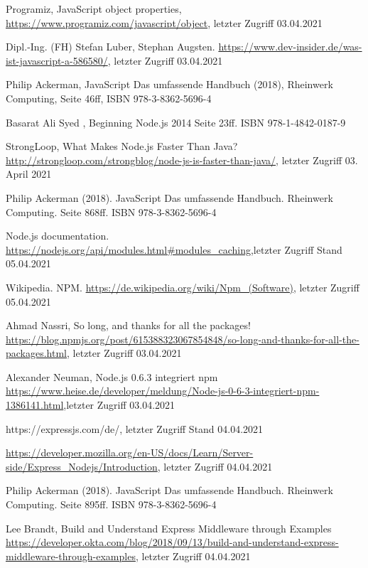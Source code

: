 \documentclass[11pt,a4paper]{article}
\begin{document}
\begin{itemize}
 Programiz, JavaScript object properties, \url{https://www.programiz.com/javascript/object}, letzter Zugriff 03.04.2021

 Dipl.-Ing. (FH) Stefan Luber, Stephan Augsten. \url{https://www.dev-insider.de/was-ist-javascript-a-586580/}, letzter Zugriff 03.04.2021

 Philip Ackerman, JavaScript Das umfassende Handbuch (2018), Rheinwerk Computing, Seite 46ff, ISBN 978-3-8362-5696-4

%
%
%
%



 Basarat Ali Syed , Beginning Node.js 2014 Seite 23ff. ISBN 978-1-4842-0187-9

 StrongLoop, What Makes Node.js Faster Than Java? \url{http://strongloop.com/strongblog/node-js-is-faster-than-java/}, letzter Zugriff 03. April 2021

 Philip Ackerman (2018). JavaScript Das umfassende Handbuch. Rheinwerk Computing. Seite 868ff. ISBN 978-3-8362-5696-4

 Node.js documentation. \url{https://nodejs.org/api/modules.html#modules_caching},letzter Zugriff Stand 05.04.2021

 Wikipedia. NPM. \url{https://de.wikipedia.org/wiki/Npm_(Software)}, letzter Zugriff 05.04.2021

 Ahmad Nassri, So long, and thanks for all the packages! \url{https://blog.npmjs.org/post/615388323067854848/so-long-and-thanks-for-all-the-packages.html}, letzter Zugriff 03.04.2021

 Alexander Neuman, Node.js 0.6.3 integriert npm
\url{https://www.heise.de/developer/meldung/Node-js-0-6-3-integriert-npm-1386141.html},letzter Zugriff 03.04.2021

 https://expressjs.com/de/, letzter Zugriff Stand 04.04.2021 

 \url{https://developer.mozilla.org/en-US/docs/Learn/Server-side/Express_Nodejs/Introduction}, letzter Zugriff 04.04.2021

 Philip Ackerman (2018). JavaScript Das umfassende Handbuch. Rheinwerk Computing. Seite 895ff. ISBN 978-3-8362-5696-4

 Lee Brandt, Build and Understand Express Middleware through Examples \url{https://developer.okta.com/blog/2018/09/13/build-and-understand-express-middleware-through-examples}, letzter Zugriff 04.04.2021


\end{itemize}
\end{document}
